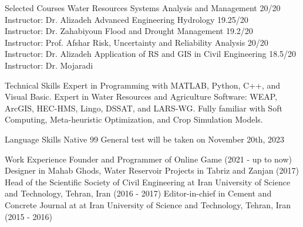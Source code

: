 \documentclass{resume}
\begin{document}
\vspace{0cm}
\begin{category} {Selected Courses}
\citembullet Water Resources Systems Analysis and Management
\hfill 20/20
\\ Instructor: Dr. Alizadeh
\citembullet Advanced Engineering Hydrology 
\hfill 19.25/20
\\ Instructor: Dr. Zahabiyoun
\citembullet Flood and Drought Management 
\hfill 19.2/20
\\ Instructor: Prof. Afshar
\citembullet Risk, Uncertainty and Reliability Analysis 
\hfill 20/20
\\ Instructor: Dr. Alizadeh
\citembullet Application of RS and GIS in Civil Engineering
\hfill 18.5/20
\\ Instructor: Dr. Mojaradi
\end{category}
\vspace{0cm}
\begin{category} {Technical Skills}
\citembullet Expert in Programming with MATLAB, Python, C++, and Visual Basic.
\citembullet Expert in Water Resources and Agriculture Software: WEAP, ArcGIS, HEC-HMS, Lingo, DSSAT, and LARS-WG.
\citembullet Fully familiar with Soft Computing, Meta-heuristic Optimization, and Crop Simulation Models.
\end{category}
\vspace{0cm}
\begin{category} {Language Skills}
 Native
 99
 General test will be taken on November 20th, 2023
\end{category}
\vspace{0cm}
\begin{category} {Work Experience}
\citembullet Founder and Programmer of Online Game
\hfill (2021 - up to now)
\citembullet Designer in Mahab Ghods, Water Reservoir Projects in Tabriz and Zanjan
\hfill (2017)
\citembullet Head of the Scientific Society of Civil Engineering at Iran University of Science and Technology, Tehran, Iran
\hfill (2016 - 2017)
\citembullet Editor-in-chief in Cement and Concrete Journal at at Iran University of Science and Technology, Tehran, Iran
\hfill (2015 - 2016)
\end{category}
\end{document}
